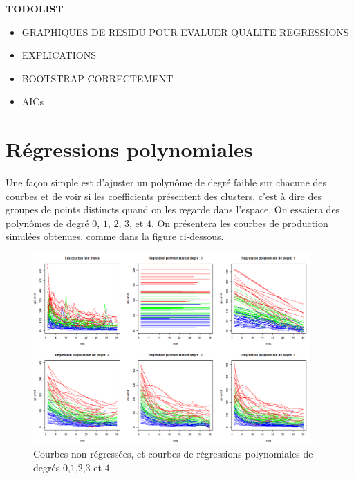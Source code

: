 \documentclass[12pt]{article}
\begin{document}
\small{
\tableofcontents 
}

\textbf{TODOLIST}
\begin{itemize}
	\item GRAPHIQUES DE RESIDU POUR EVALUER QUALITE REGRESSIONS
	\item EXPLICATIONS
	\item BOOTSTRAP CORRECTEMENT
	\item AICs
\end{itemize}

\newpage


\section{R\'egressions polynomiales}
\label{sec:reg_pol}

Une fa\c con simple est d'ajuster un polyn\^ome de degr\'e faible sur chacune des courbes et
de voir si les coefficients pr\'esentent des clusters, c'est \`a dire des groupes de points distincts
quand on les regarde dans l'espace.
On essaiera des polyn\^omes de degr\'e $0$, $1$, $2$, $3$, et $4$.
On pr\'esentera les courbes de production simul\'ees obtenues, comme dans la figure ci-dessous.

 
\begin{figure}[H]
 \centering %
	\includegraphics[width=400px]{reg_pol}
  \caption{\label{fig:polynomial_regressions} Courbes non r\'egress\'ees, et courbes de r\'egressions polynomiales de degr\'es $0$,$1$,$2$,$3$ et $4$}
\end{figure}
\end{document}
